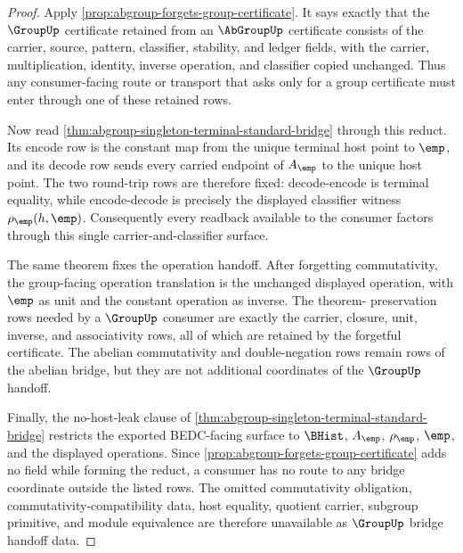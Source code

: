 \begin{proof}
Apply \autoref{prop:abgroup-forgets-group-certificate}. It says exactly that
the $\GroupUp$ certificate retained from an $\AbGroupUp$ certificate consists
of the carrier, source, pattern, classifier, stability, and ledger fields, with
the carrier, multiplication, identity, inverse operation, and classifier copied
unchanged. Thus any consumer-facing route or transport that asks only for a
group certificate must enter through one of these retained rows.

Now read \autoref{thm:abgroup-singleton-terminal-standard-bridge} through this
reduct. Its encode row is the constant map from the unique terminal host point
to $\emp$, and its decode row sends every carried endpoint of $A_{\emp}$ to the
unique host point. The two round-trip rows are therefore fixed: decode-encode is
terminal equality, while encode-decode is precisely the displayed classifier
witness $\rho_{\emp}(h,\emp)$. Consequently every readback available to the
consumer factors through this single carrier-and-classifier surface.

The same theorem fixes the operation handoff. After forgetting commutativity,
the group-facing operation translation is the unchanged displayed operation,
with $\emp$ as unit and the constant operation as inverse. The theorem-
preservation rows needed by a $\GroupUp$ consumer are exactly the carrier,
closure, unit, inverse, and associativity rows, all of which are retained by the
forgetful certificate. The abelian commutativity and double-negation rows remain
rows of the abelian bridge, but they are not additional coordinates of the
$\GroupUp$ handoff.

Finally, the no-host-leak clause of
\autoref{thm:abgroup-singleton-terminal-standard-bridge} restricts the exported
BEDC-facing surface to $\BHist$, $A_{\emp}$, $\rho_{\emp}$, $\emp$, and the
displayed operations. Since \autoref{prop:abgroup-forgets-group-certificate}
adds no field while forming the reduct, a consumer has no route to any bridge
coordinate outside the listed rows. The omitted commutativity obligation,
commutativity-compatibility data, host equality, quotient carrier, subgroup
primitive, and module equivalence are therefore unavailable as $\GroupUp$ bridge
handoff data.
\end{proof}
